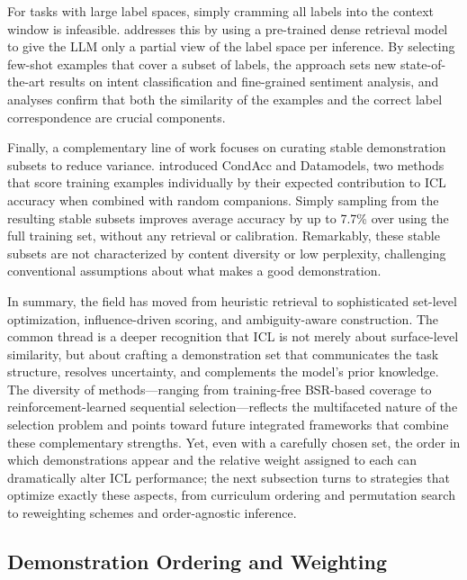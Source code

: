 \documentclass[11pt]{article}
\begin{document}
For tasks with large label spaces, simply cramming all labels into the context window is infeasible. \cite{ref75} addresses this by using a pre-trained dense retrieval model to give the LLM only a partial view of the label space per inference. By selecting few-shot examples that cover a subset of labels, the approach sets new state-of-the-art results on intent classification and fine-grained sentiment analysis, and analyses confirm that both the similarity of the examples and the correct label correspondence are crucial components.

Finally, a complementary line of work focuses on curating stable demonstration subsets to reduce variance. \cite{ref76} introduced CondAcc and Datamodels, two methods that score training examples individually by their expected contribution to ICL accuracy when combined with random companions. Simply sampling from the resulting stable subsets improves average accuracy by up to 7.7\% over using the full training set, without any retrieval or calibration. Remarkably, these stable subsets are not characterized by content diversity or low perplexity, challenging conventional assumptions about what makes a good demonstration.

In summary, the field has moved from heuristic retrieval to sophisticated set-level optimization, influence-driven scoring, and ambiguity-aware construction. The common thread is a deeper recognition that ICL is not merely about surface-level similarity, but about crafting a demonstration set that communicates the task structure, resolves uncertainty, and complements the model's prior knowledge. The diversity of methods---ranging from training-free BSR-based coverage to reinforcement-learned sequential selection---reflects the multifaceted nature of the selection problem and points toward future integrated frameworks that combine these complementary strengths. Yet, even with a carefully chosen set, the order in which demonstrations appear and the relative weight assigned to each can dramatically alter ICL performance; the next subsection turns to strategies that optimize exactly these aspects, from curriculum ordering and permutation search to reweighting schemes and order-agnostic inference.

\subsection{Demonstration Ordering and Weighting}
\end{document}
